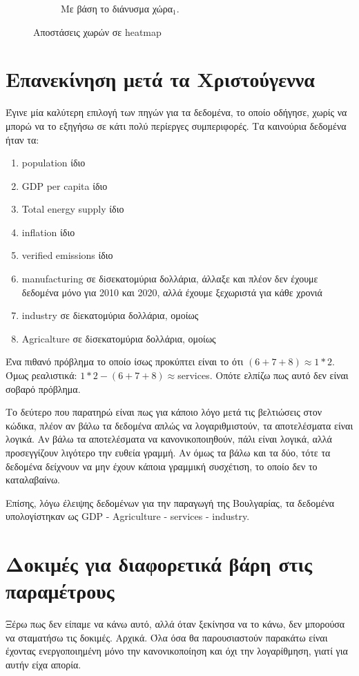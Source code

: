 \documentclass[a4paper,twoside,10pt]{article}
\begin{document}
\begin{figure}[H]
\begin{subfigure}[b]{0.3\textwidth}
			\caption{Με βάση το διάνυσμα χώρα$_1$.}
			\label{fig:five over x}
		\end{subfigure}
		\caption{Αποστάσεις χωρών σε heatmap}
		\label{fig:three graphs}
	\end{figure}
	\section{Επανεκίνηση μετά τα Χριστούγεννα}
	Έγινε μία καλύτερη επιλογή των πηγών για τα δεδομένα, το οποίο οδήγησε, χωρίς να μπορώ να το εξηγήσω σε κάτι πολύ περίεργες συμπεριφορές.
	Τα καινούρια δεδομένα ήταν τα:
	\begin{enumerate}
		\item population ίδιο
		\item GDP per capita ίδιο
		\item Total energy supply ίδιο
		\item inflation ίδιο
		\item verified emissions ίδιο
		\item manufacturing σε δiσεκατομύρια δολλάρια, άλλαξε και πλέον δεν έχουμε δεδομένα μόνο για 2010 και 2020, αλλά έχουμε ξεχωριστά για κάθε χρονιά
		\item industry σε δiεκατομύρια δολλάρια, ομοίως
		\item Agricalture σε δiσεκατομύρια δολλάρια, ομοίως
	\end{enumerate}
	Ένα πιθανό πρόβλημα το οποίο ίσως προκύπτει είναι το ότι $(6+7+8) \approx 1*2$. Όμως ρεαλιστικά: $1*2 - (6+7+8) \approx $services. Οπότε ελπίζω πως αυτό δεν είναι σοβαρό πρόβλημα. 
	
	Το δεύτερο που παρατηρώ είναι πως για κάποιο λόγο μετά τις βελτιώσεις στον κώδικα, πλέον αν βάλω τα δεδομένα απλώς να λογαριθμιστούν, τα αποτελέσματα είναι λογικά. Αν βάλω τα αποτελέσματα να κανονικοποιηθούν, πάλι είναι λογικά, αλλά προσεγγίζουν λιγότερο την ευθεία γραμμή. Αν όμως τα βάλω και τα δύο, τότε τα δεδομένα δείχνουν να μην έχουν κάποια γραμμική συσχέτιση, το οποίο δεν το καταλαβαίνω. 
	
	Επίσης, λόγω έλειψης δεδομένων για την παραγωγή της Βουλγαρίας, τα δεδομένα υπολογίστηκαν ως GDP - Agriculture - services - industry.
	
	\section{Δοκιμές για διαφορετικά βάρη στις παραμέτρους}
	Ξέρω πως δεν είπαμε να κάνω αυτό, αλλά όταν ξεκίνησα να το κάνω, δεν μπορούσα να σταματήσω τις δοκιμές. Αρχικά. Όλα όσα θα παρουσιαστούν παρακάτω είναι έχοντας ενεργοποιημένη μόνο την κανονικοποίηση και όχι την λογαρίθμηση, γιατί για αυτήν είχα απορία. 
	
\end{document}
